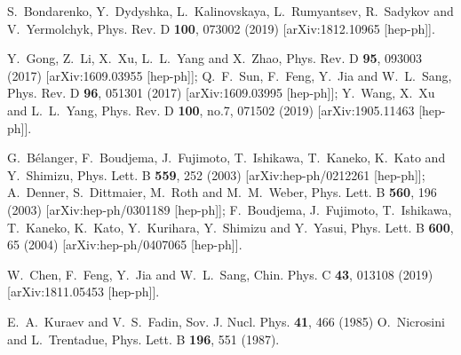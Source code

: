 \documentclass[12pt]{article}
\begin{document}
\begin{thebibliography}{99}
S.~Bondarenko, Y.~Dydyshka, L.~Kalinovskaya, L.~Rumyantsev, R.~Sadykov and V.~Yermolchyk,
Phys. Rev. D \textbf{100}, 073002 (2019)
[arXiv:1812.10965 [hep-ph]].

Y.~Gong, Z.~Li, X.~Xu, L.~L.~Yang and X.~Zhao,
Phys. Rev. D \textbf{95}, 093003 (2017)
[arXiv:1609.03955 [hep-ph]];
Q.~F.~Sun, F.~Feng, Y.~Jia and W.~L.~Sang,
Phys. Rev. D \textbf{96}, 051301 (2017)
[arXiv:1609.03995 [hep-ph]];
Y.~Wang, X.~Xu and L.~L.~Yang,
Phys. Rev. D \textbf{100}, no.7, 071502 (2019)
[arXiv:1905.11463 [hep-ph]].

G.~B\'elanger, F.~Boudjema, J.~Fujimoto, T.~Ishikawa, T.~Kaneko, K.~Kato and Y.~Shimizu,
Phys. Lett. B \textbf{559}, 252 (2003)
[arXiv:hep-ph/0212261 [hep-ph]];
A.~Denner, S.~Dittmaier, M.~Roth and M.~M.~Weber,
Phys. Lett. B \textbf{560}, 196 (2003)
[arXiv:hep-ph/0301189 [hep-ph]];
F.~Boudjema, J.~Fujimoto, T.~Ishikawa, T.~Kaneko, K.~Kato, Y.~Kurihara, Y.~Shimizu and Y.~Yasui,
Phys. Lett. B \textbf{600}, 65 (2004)
[arXiv:hep-ph/0407065 [hep-ph]].

W.~Chen, F.~Feng, Y.~Jia and W.~L.~Sang,
Chin. Phys. C \textbf{43}, 013108 (2019)
[arXiv:1811.05453 [hep-ph]].

E.~A.~Kuraev and V.~S.~Fadin,
Sov. J. Nucl. Phys. \textbf{41}, 466 (1985)
O.~Nicrosini and L.~Trentadue,
Phys. Lett. B \textbf{196}, 551 (1987).


\end{thebibliography}
\end{document}
